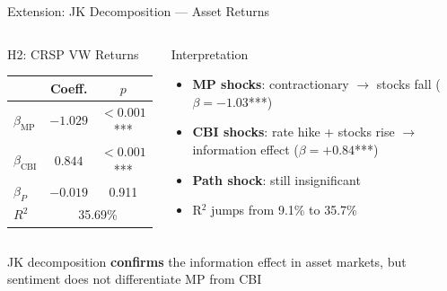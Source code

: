 \documentclass[aspectratio=169, 11pt]{beamer}
\begin{document}
\begin{frame}{Extension: JK Decomposition — Asset Returns}
\begin{columns}[T]
\begin{ablock}{H2: CRSP VW Returns}
{\small
\begin{tabular}{lcc}
\toprule
 & Coeff. & $p$ \\
\midrule
$\beta_\text{MP}$ & $-1.029$ & $<0.001$*** \\
$\beta_\text{CBI}$ & $0.844$ & $<0.001$*** \\
$\beta_P$ & $-0.019$ & 0.911 \\
\midrule
$R^2$ & \multicolumn{2}{c}{35.69\%} \\
\bottomrule
\end{tabular}
}
\end{ablock}

\begin{aexampleblock}{Interpretation}
\begin{itemize}
  \item \textbf{MP shocks}: contractionary $\to$ stocks fall ($\beta = -1.03$***)
  \item \textbf{CBI shocks}: rate hike + stocks rise $\to$ information effect ($\beta = +0.84$***)
  \item \textbf{Path shock}: still insignificant
  \item R$^2$ jumps from 9.1\% to 35.7\%
\end{itemize}
\end{aexampleblock}
\end{columns}

\vspace{0.3em}
\begin{center}
{\small JK decomposition \textbf{confirms} the information effect in asset markets, but sentiment does not differentiate MP from CBI}
\end{center}
\end{frame}
\end{document}
